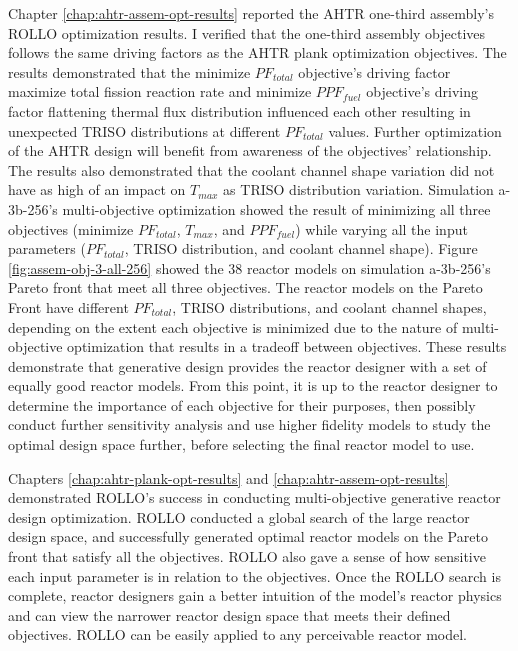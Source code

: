Chapter \ref{chap:ahtr-assem-opt-results} reported the \gls{AHTR} one-third assembly's
\gls{ROLLO} optimization results.
I verified that the one-third assembly objectives follows the same driving 
factors as the \gls{AHTR} plank optimization objectives. 
The results demonstrated that the minimize $PF_{total}$ objective's driving factor 
maximize total fission reaction rate and minimize $PPF_{fuel}$ objective's driving 
factor flattening thermal flux distribution influenced each other resulting in unexpected 
TRISO distributions at different $PF_{total}$ values. 
Further optimization of the \gls{AHTR} design will benefit from awareness 
of the objectives' relationship. 
The results also demonstrated that the coolant channel shape variation did 
not have as high of an impact on $T_{max}$ as \gls{TRISO} distribution variation.
Simulation a-3b-256's multi-objective optimization showed the result of minimizing all 
three objectives (minimize $PF_{total}$, $T_{max}$, and $PPF_{fuel}$) while varying 
all the input parameters ($PF_{total}$, TRISO distribution, and coolant channel shape).
Figure \ref{fig:assem-obj-3-all-256} showed the 38 reactor models on simulation 
a-3b-256's Pareto front that meet all three objectives. 
The reactor models on the Pareto Front have different $PF_{total}$, TRISO distributions, 
and coolant channel shapes, depending on the extent each objective is minimized due 
to the nature of multi-objective optimization that results in a tradeoff between 
objectives. 
These results demonstrate that generative design provides the reactor designer with a 
set of equally good reactor models. 
From this point, it is up to the reactor designer to determine the importance of each 
objective for their purposes, then possibly conduct further sensitivity analysis and 
use higher fidelity models to study the optimal design space further, before selecting 
the final reactor model to use.

Chapters \ref{chap:ahtr-plank-opt-results} and \ref{chap:ahtr-assem-opt-results} 
demonstrated \gls{ROLLO}'s success in conducting multi-objective generative reactor 
design optimization. 
\gls{ROLLO} conducted a global search of the large reactor design space, and successfully 
generated optimal reactor models on the Pareto front that satisfy all the objectives. 
\gls{ROLLO} also gave a sense of how sensitive each input parameter is in relation to 
the objectives. 
Once the \gls{ROLLO} search is complete, reactor designers gain a better intuition of 
the model's reactor physics and can view the narrower reactor design space that meets 
their defined objectives. 
\gls{ROLLO} can be easily applied to any perceivable reactor model.  

